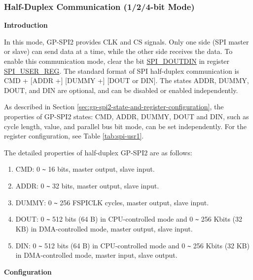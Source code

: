 \documentclass[main\_\_EN.tex]{subfiles}
\begin{document}
\subsubsection{Half-Duplex Communication (1/2/4-bit Mode)}
\label{sec:gp-spi2-1/2/8-bits}

\textbf{Introduction}

In this mode, GP-SPI2 provides CLK and CS signals. Only one side (SPI master or slave) can send data at a time, while the other side receives the data. To enable this communication mode, clear the bit \hyperref[fielddesc:SPIDOUTDIN]{SPI\_DOUTDIN} in register \hyperref[regdesc:SPIUSERREG]{SPI\_USER\_REG}. The standard format of SPI half-duplex communication is CMD + [ADDR +] [DUMMY +] [DOUT or DIN]. The states ADDR, DUMMY, DOUT, and DIN are optional, and can be disabled or enabled independently.

As described in Section \ref{sec:gp-spi2-state-and-register-configuration}, the properties of GP-SPI2 states: CMD, ADDR, DUMMY, DOUT and DIN, such as cycle length, value, and parallel bus bit mode, can be set independently. For the register configuration, see Table \ref{tab:spi-usr1}.

The detailed properties of half-duplex GP-SPI2 are as follows:

\begin{enumerate}
    \item CMD: 0 \verb+~+ 16 bits, master output, slave input.
    \item ADDR: 0 \verb+~+ 32 bits, master output, slave input.
    \item DUMMY: 0 \verb+~+ 256 FSPICLK cycles, master output, slave input.
    \item DOUT: 0 \verb+~+ 512 bits (64 B) in CPU-controlled mode and 0 \verb+~+ 256 Kbits (32 KB) in DMA-controlled mode, master output, slave input.
   
    \item DIN: 0 \verb+~+ 512 bits (64 B) in CPU-controlled mode and 0 \verb+~+ 256 Kbits (32 KB) in DMA-controlled mode, master input, slave output.
\end{enumerate}

\textbf{Configuration}
\end{document}
